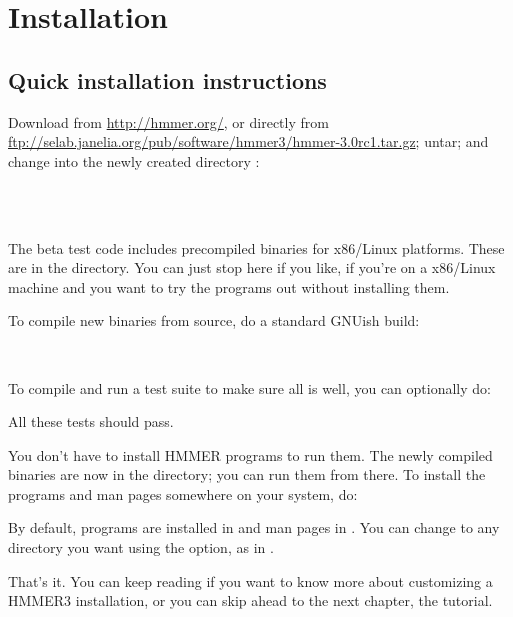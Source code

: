 \section{Installation}
\label{section:installation}
\setcounter{footnote}{0}

\subsection{Quick installation instructions}

Download  from
\url{http://hmmer.org/}, or directly from
\url{ftp://selab.janelia.org/pub/software/hmmer3/hmmer-3.0rc1.tar.gz};
untar; and change into the newly created directory :

\\
\\

The beta test code includes precompiled binaries for x86/Linux
platforms. These are in the  directory. You can just
stop here if you like, if you're on a x86/Linux machine and you want
to try the programs out without installing them.

To compile new binaries from source, do a standard GNUish build:

\\ 

To compile and run a test suite to make sure all is well, you can
optionally do:


All these tests should pass.

You don't have to install HMMER programs to run them. The newly
compiled binaries are now in the  directory; you can run
them from there. To install the programs and man pages somewhere on
your system, do:


By default, programs are installed in  and man
pages in . You can change 
to any directory you want using the 
option, as in .

That's it.  You can keep reading if you want to know more about
customizing a HMMER3 installation, or you can skip ahead to the next
chapter, the tutorial.




